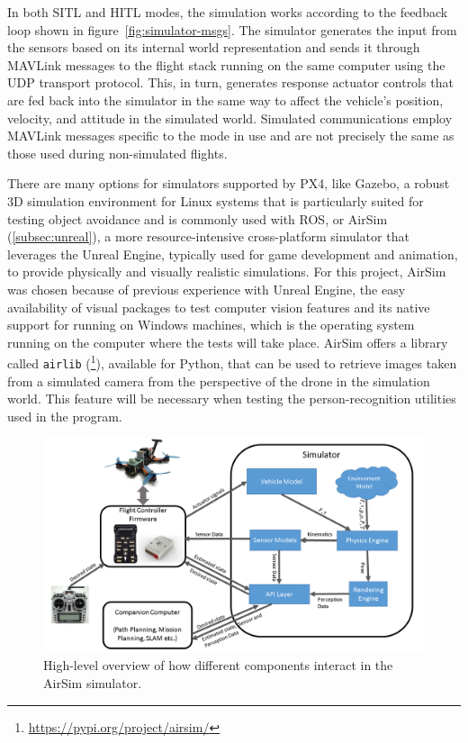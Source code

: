 In both SITL and HITL modes, the simulation works according to the feedback loop shown in figure~\ref{fig:simulator-msgs}. 
The simulator generates the input from the sensors based on its internal world representation and sends it through MAVLink messages to the flight stack running on the same computer using the UDP transport protocol.
This, in turn, generates response actuator controls that are fed back into the simulator in the same way to affect the vehicle's position, velocity, and attitude in the simulated world.
Simulated communications employ MAVLink messages specific to the mode in use and are not precisely the same as those used during non-simulated flights.

There are many options for simulators supported by PX4, like Gazebo, a robust 3D simulation environment for Linux systems that is particularly suited for testing object avoidance and is commonly used with ROS, or AirSim (\ref{subsec:unreal}), a more resource-intensive cross-platform simulator that leverages the Unreal Engine, typically used for game development and animation, to provide physically and visually realistic simulations.
For this project, AirSim was chosen because of previous experience with Unreal Engine, the easy availability of visual packages to test computer vision features and its native support for running on Windows machines, which is the operating system running on the computer where the tests will take place.
AirSim offers a library called \texttt{airlib} (\footnote{\url{https://pypi.org/project/airsim/}}), available for Python, that can be used to retrieve images taken from a simulated camera from the perspective of the drone in the simulation world.
This feature will be necessary when testing the person-recognition utilities used in the program.

\begin{figure}
  \centering
  \includegraphics[width=\textwidth,keepaspectratio]{img/airsim-overview.png}
  \caption{High-level overview of how different components interact in the AirSim simulator.}
  \label{fig:airsim-overview}
\end{figure}

